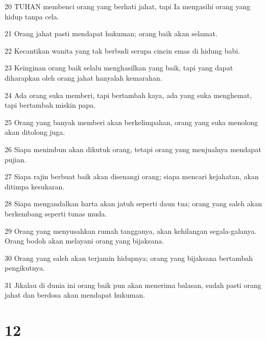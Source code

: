 \par 20 TUHAN membenci orang yang berhati jahat, tapi Ia mengasihi orang yang hidup tanpa cela.
\par 21 Orang jahat pasti mendapat hukuman; orang baik akan selamat.
\par 22 Kecantikan wanita yang tak berbudi serupa cincin emas di hidung babi.
\par 23 Keinginan orang baik selalu menghasilkan yang baik, tapi yang dapat diharapkan oleh orang jahat hanyalah kemarahan.
\par 24 Ada orang suka memberi, tapi bertambah kaya, ada yang suka menghemat, tapi bertambah miskin papa.
\par 25 Orang yang banyak memberi akan berkelimpahan, orang yang suka menolong akan ditolong juga.
\par 26 Siapa menimbun akan dikutuk orang, tetapi orang yang menjualnya mendapat pujian.
\par 27 Siapa rajin berbuat baik akan disenangi orang; siapa mencari kejahatan, akan ditimpa kesukaran.
\par 28 Siapa mengandalkan harta akan jatuh seperti daun tua; orang yang saleh akan berkembang seperti tunas muda.
\par 29 Orang yang menyusahkan rumah tangganya, akan kehilangan segala-galanya. Orang bodoh akan melayani orang yang bijaksana.
\par 30 Orang yang saleh akan terjamin hidupnya; orang yang bijaksana bertambah pengikutnya.
\par 31 Jikalau di dunia ini orang baik pun akan menerima balasan, sudah pasti orang jahat dan berdosa akan mendapat hukuman.

\chapter{12}

